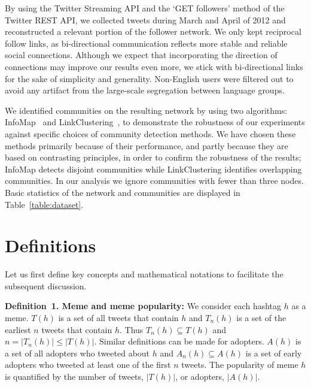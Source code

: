 \documentclass[letterpaper]{article}
\begin{document}
By using the Twitter Streaming API and the `GET followers' method of the Twitter REST API, we collected tweets during March and April of 2012 and reconstructed a relevant portion of the follower network. We only kept reciprocal follow links, as bi-directional communication reflects more stable and reliable social connections. Although we expect that incorporating the direction of connections may improve our results even more, we stick with bi-directional links for the sake of simplicity and generality. Non-English users were filtered out to avoid any artifact from the large-scale segregation between language groups.


We identified communities on the resulting network by using two algorithms: InfoMap~\cite{Rosvall2008InfoMap} and LinkClustering~\cite{Ahn2010LinkCommunity}, to demonstrate the robustness of our experiments against specific choices of community detection methods. 
We have chosen these methods primarily because of their performance, and partly because they are based on contrasting principles, in order to confirm the robustness of the results; InfoMap detects disjoint communities while LinkClustering identifies overlapping communities. 
In our analysis we ignore communities with fewer than three nodes.
Basic statistics of the network and communities are displayed in Table~\ref{table:dataset}.



\section{Definitions}

Let us first define key concepts and mathematical notations to facilitate the subsequent discussion.

\noindent \textbf{Definition~1. Meme and meme popularity:} 
We consider each hashtag $h$ as a meme. 
$T(h)$ is a set of all tweets that contain $h$ and $T_n(h)$ is a set of the earliest $n$ tweets that contain $h$. 
Thus $T_n(h) \subseteq T(h)$ and $n = |T_n(h)| \leq |T(h)|$.  
Similar definitions can be made for adopters. 
$A(h)$ is a set of all adopters who tweeted about $h$ and $A_n(h) \subseteq A(h)$ is a set of early adopters who tweeted at least one of the first $n$ tweets. 
The popularity of meme $h$ is quantified by the number of tweets, $|T(h)|$, or adopters, $|A(h)|$. 
\end{document}
